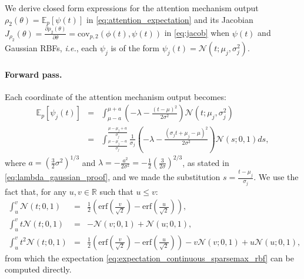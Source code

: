 \documentclass{article}
\begin{document}
We  derive closed form expressions for the attention mechanism output $\rho_2(\theta) = \mathbb{E}_{p}[\psi(t)]$ in \eqref{eq:attention_expectation} and its Jacobian $J_{\rho_2}(\theta) = \frac{\partial \rho_2(\theta)}{\partial \theta} = \mathrm{cov}_{p, 2}(\phi(t), \psi(t))$ in \eqref{eq:jacob} when $\psi(t)$ and Gaussian RBFs, {\it i.e.}, each $\psi_j$ is of the form $\psi_j(t) = \mathcal{N}(t; \mu_j, \sigma_j^2)$.

\paragraph{Forward pass.}
Each coordinate of the attention mechanism output becomes:
\begin{eqnarray}\label{eq:expectation_continuous_sparsemax_rbf}
\mathbb{E}_{p}[\psi_j(t)] &=& \int_{\mu-a}^{\mu+a} \left(-\lambda - \frac{(t-\mu)^2}{2\sigma^2}\right)  \mathcal{N}(t; \mu_j, \sigma_j^2)\nonumber\\
&=& \int_{\frac{\mu-\mu_j-a}{\sigma_j}}^{\frac{\mu-\mu_j+a}{\sigma_j}} \frac{1}{\sigma_j} \left(-\lambda - \frac{(\sigma_j t + \mu_j - \mu)^2}{2\sigma^2}\right)  \mathcal{N}(s; 0, 1) ds,
\end{eqnarray}
where $a=(\frac{3}{2}\sigma^2)^{1/3}$ and $\lambda=-\frac{a^2}{2\sigma^2} = -\frac{1}{2}(\frac{3}{2\sigma})^{2/3}$, as stated in \eqref{eq:lambda_gaussian_proof}, and we made the substitution
$s = \frac{t-\mu_j}{\sigma_j}$. 
We use the fact that, for any $u, v \in \mathbb{R}$ such that $u \le v$:
\begin{eqnarray}\label{eq:erf_expr123}
\int_{u}^{v} \mathcal{N}(t; 0, 1) &=&  \frac{1}{2}\left( \mathrm{erf}\left(\frac{v}{\sqrt{2}}\right) - \mathrm{erf}\left(\frac{u}{\sqrt{2}}\right) \right),\nonumber\\
\int_{u}^{v} t\mathcal{N}(t; 0, 1) &=&  -\mathcal{N}(v; 0, 1) + \mathcal{N}(u; 0, 1),\nonumber\\
\int_{u}^{v} t^2\mathcal{N}(t; 0, 1) &=&
\frac{1}{2}\left( \mathrm{erf}\left(\frac{v}{\sqrt{2}}\right) - \mathrm{erf}\left(\frac{u}{\sqrt{2}}\right) \right) - v\mathcal{N}(v; 0, 1) + u\mathcal{N}(u; 0, 1),
\end{eqnarray}
from which the expectation \eqref{eq:expectation_continuous_sparsemax_rbf} can be computed directly.
\end{document}
